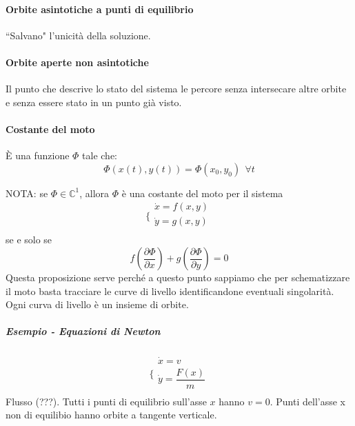 \documentclass[a4paper,12pt]{article}
\begin{document}
\paragraph{Orbite asintotiche a punti di equilibrio}
``Salvano" l'unicità della soluzione.
\paragraph{Orbite aperte non asintotiche}
Il punto che descrive lo stato del sistema le percore senza intersecare altre orbite e senza essere stato in un punto già visto.
\paragraph{Costante del moto}
È una funzione $\Phi$ tale che:
$$\Phi(x(t), y(t)) = \Phi(x_0, y_0)\ \ \forall t$$

NOTA: se $\Phi \in \mathbb{C}^1$, allora $\Phi$ è una costante del moto per il sistema
$$\bigg\{ \begin{array}{l}
\dot{x} = f(x, y)\\
\dot{y} = g(x, y)\\
\end{array}$$
se e solo se
$$f\left(\dfrac{\partial \Phi}{\partial x}\right) + g\left(\dfrac{\partial \Phi}{\partial y}\right) = 0$$
Questa proposizione serve perché a questo punto sappiamo che per schematizzare il moto basta tracciare le curve di livello identificandone eventuali singolarità. Ogni curva di livello è un insieme di orbite.

\subparagraph{Esempio - Equazioni di Newton}
$$\Biggl\{ \begin{array}{l}
\dot{x} = v\\
\dot{y} = \dfrac{F(x)}{m}\\
\end{array}$$
Flusso (???).
Tutti i punti di equilibrio sull'asse $x$ hanno $v=0$.
Punti dell'asse x non di equilibio hanno orbite a tangente verticale.
\end{document}

